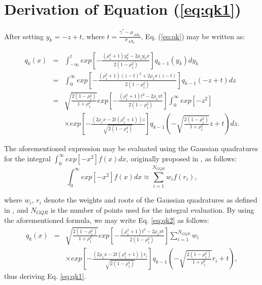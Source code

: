 \documentclass[12pt,draftcls, onecolumn]{IEEEtran}
\begin{document}
\appendices 

\section{Derivation of Equation (\ref{eq:qk1})}
\label{a4}

After setting $y_k = -z+t$, where $t = \frac{\gamma^* -\mu_{AR_k}}{\sigma_{AR_k}}$, Eq. (\ref{eq:qk}) may be written as:

\begingroup
\begin{eqnarray}
q_k(x) & = & \int^{t}_{-\infty}exp\left[-\frac{\left(\rho_1^2+1\right)y^2_k-2\rho_1 y_kx}{2\left(1-\rho_1^2\right)}\right]q_{k-1}(y_k)dy_k\nonumber\\
			 & = & \int^{\infty}_{0}exp\left[-\frac{\left(\rho_1^2+1\right)\left(z-t\right)^2+2\rho_1 x\left(z-t\right)}{2\left(1-\rho_1^2\right)}\right]q_{k-1}(-z+t)dz\nonumber\\
& = & \sqrt{\frac{2\left(1-\rho_1^2\right)}{1+\rho_1^2}}exp\left[-\frac{\left(\rho_1^2+1\right)t^2-2\rho_1 xt}{2\left(1-\rho_1^2\right)}\right] \int^{\infty}_{0}exp\left[-z^2\right]\nonumber\\
			 && \times exp\left[-\frac{\left(2\rho_1 x - 2t\left(\rho_1^2+1\right)\right)z}{\sqrt{2\left(1-\rho_1^4\right)}}\right]q_{k-1}(-\sqrt{\frac{2\left(1-\rho_1^2\right)}{1+\rho_1^2}}z+t)dz.\label{eq:qk2}
\end{eqnarray}
\endgroup

\noindent The aforementioned expression may be evaluated using the Gaussian quadratures for the integral $\int^{\infty}_{0}exp\left[-x^2\right]f(x)dx$, originally proposed in \cite[Table II, N=15]{1969method}, as follows:
\begin{equation}
\int^{\infty}_{0}exp\left[-x^2\right]f(x)dx \approx \sum^{N_{GQR}}_{i=1}w_i f(r_i),
\end{equation}

\noindent where $w_i$, $r_i$ denote the weights and roots of the Gaussian quadratures as defined in \cite[Table II, N=15]{1969method}, and $N_{GQR}$ is the number of points used for the integral evaluation. By using the aforementioned formula, we may write Eq. \eqref{eq:qk2} as follows:
\begingroup
\begin{eqnarray}
q_k(x) & = & \sqrt{\frac{2\left(1-\rho_1^2\right)}{1+\rho_1^2}}exp\left[-\frac{\left(\rho_1^2+1\right)t^2-2\rho_1 xt}{2\left(1-\rho_1^2\right)}\right] \sum^{N_{GQR}}_{i=1}w_i \nonumber\\
			 && \times exp\left[-\frac{\left(2\rho_1 x - 2t\left(\rho_1^2+1\right)\right)r_i}{\sqrt{2\left(1-\rho_1^4\right)}}\right]q_{k-1}(-\sqrt{\frac{2\left(1-\rho_1^2\right)}{1+\rho_1^2}}r_i+t),
\end{eqnarray}
\endgroup
thus deriving Eq. \eqref{eq:qk1}.
\end{document}
